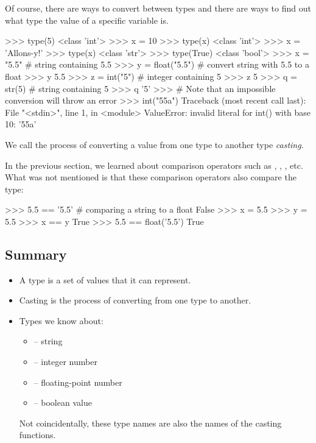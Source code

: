 \documentclass[11pt]{cselabheader}
\begin{document}
Of course, there are ways to convert between types and there are ways to find
out what type the value of a specific variable is.
\begin{pyconcode}
>>> type(5)
<class 'int'>
>>> x = 10
>>> type(x)
<class 'int'>
>>> x = 'Allons-y!'
>>> type(x)
<class 'str'>
>>> type(True)
<class 'bool'>
>>> x = "5.5" # string containing 5.5
>>> y = float("5.5") # convert string with 5.5 to a float
>>> y
5.5
>>> z = int("5") # integer containing 5
>>> z
5
>>> q = str(5) # string containing 5
>>> q
'5'
>>> # Note that an impossible conversion will throw an error
>>> int("55a")
Traceback (most recent call last):
  File "<stdin>", line 1, in <module>
ValueError: invalid literal for int() with base 10: '55a'
\end{pyconcode}

We call the process of converting a value from one type to another type
\emph{casting}.

In the previous section, we learned about comparison operators
such as \pythoninline{!=}, \pythoninline{<}, \pythoninline{>}, etc. What was not
mentioned is that these comparison operators also compare the type:
\begin{pyconcode}
>>> 5.5 == '5.5' # comparing a string to a float
False
>>> x = 5.5
>>> y = 5.5
>>> x == y 
True
>>> 5.5 == float('5.5')
True
\end{pyconcode}

\subsection{Summary}

\begin{itemize}
  \item A type is a set of values that it can represent.
  \item Casting is the process of converting from one type to another.
  \item Types we know about:
    \begin{multicols}{2}
      \begin{itemize}
        \item {} -- string
        \item {} -- integer number
        \item {} -- floating-point number
        \item {} -- boolean value
      \end{itemize}
    \end{multicols}
    Not coincidentally, these type names are also the names of the casting
    functions.
\end{itemize}
\end{document}
